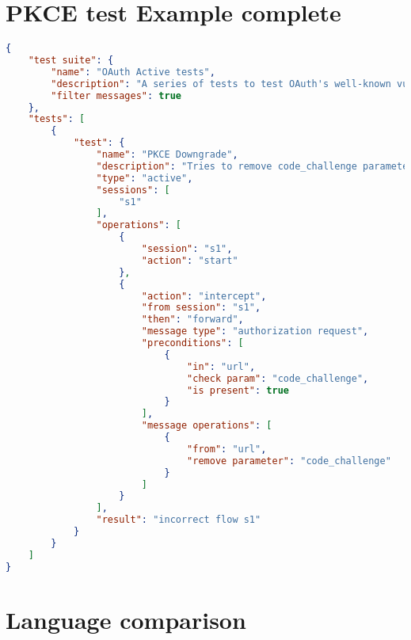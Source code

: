 \chapter{PKCE test Example complete}
\label{chap:PKCE_complete}
\begin{lstlisting}[language=json]
{
    "test suite": {
        "name": "OAuth Active tests",
        "description": "A series of tests to test OAuth's well-known vulnerabilities",
        "filter messages": true
    },
    "tests": [     
        {
            "test": {
                "name": "PKCE Downgrade",
                "description": "Tries to remove code_challenge parameter",
                "type": "active",
                "sessions": [
                    "s1"
                ],
                "operations": [
                    {
                        "session": "s1",
                        "action": "start"
                    },
                    {
                        "action": "intercept",
                        "from session": "s1",
                        "then": "forward",
                        "message type": "authorization request",
                        "preconditions": [
                            {
                                "in": "url",
                                "check param": "code_challenge",
                                "is present": true
                            }
                        ],
                        "message operations": [
                            {
                                "from": "url",
                                "remove parameter": "code_challenge"
                            }
                        ]
                    }
                ],
                "result": "incorrect flow s1"
            }
        }
    ]
}
\end{lstlisting}

\chapter{Language comparison}
\label{attachment:languages_comparison}

